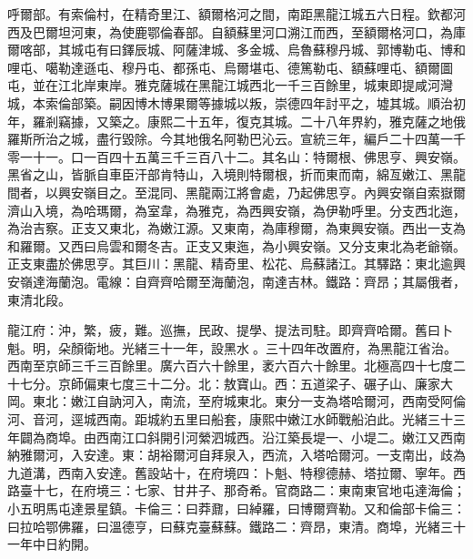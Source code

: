\begin{pinyinscope}
呼爾部。有索倫村，在精奇里江、額爾格河之間，南距黑龍江城五六日程。欽都河西及巴爾坦河東，為使鹿鄂倫春部。自額蘇里河口溯江而西，至額爾格河口，為庫爾喀部，其城屯有曰鐸辰城、阿薩津城、多金城、烏魯蘇穆丹城、郭博勒屯、博和哩屯、噶勒達遜屯、穆丹屯、都孫屯、烏爾堪屯、德篤勒屯、額蘇哩屯、額爾圖屯，並在江北岸東岸。雅克薩城在黑龍江城西北一千三百餘里，城東即提咸河灣城，本索倫部築。嗣因博木博果爾等據城以叛，崇德四年討平之，墟其城。順治初年，羅剎竊據，又築之。康熙二十五年，復克其城。二十八年界約，雅克薩之地俄羅斯所治之城，盡行毀除。今其地俄名阿勒巴沁云。宣統三年，編戶二十四萬一千零一十一。口一百四十五萬三千三百八十二。其名山：特爾根、佛思亨、興安嶺。黑省之山，皆脈自車臣汗部肯特山，入境則特爾根，折而東而南，綿亙嫩江、黑龍間者，以興安嶺目之。至混同、黑龍兩江將會處，乃起佛思亨。內興安嶺自索嶽爾濟山入境，為哈瑪爾，為室韋，為雅克，為西興安嶺，為伊勒呼里。分支西北迤，為治吉察。正支又東北，為嫩江源。又東南，為庫穆爾，為東興安嶺。西出一支為和羅爾。又西曰烏雲和爾冬吉。正支又東迤，為小興安嶺。又分支東北為老爺嶺。正支東盡於佛思亨。其巨川：黑龍、精奇里、松花、烏蘇諸江。其驛路：東北逾興安嶺達海蘭泡。電線：自齊齊哈爾至海蘭泡，南達吉林。鐵路：齊昂；其屬俄者，東清北段。

龍江府：沖，繁，疲，難。巡撫，民政、提學、提法司駐。即齊齊哈爾。舊曰卜魁。明，朵顏衛地。光緒三十一年，設黑水。三十四年改置府，為黑龍江省治。西南至京師三千三百餘里。廣六百六十餘里，袤六百六十餘里。北極高四十七度二十七分。京師偏東七度三十二分。北：敖寶山。西：五道梁子、碾子山、廉家大岡。東北：嫩江自訥河入，南流，至府城東北。東分一支為塔哈爾河，西南受阿倫河、音河，逕城西南。距城約五里曰船套，康熙中嫩江水師戰船泊此。光緒三十三年闢為商埠。由西南江口斜開引河縈泗城西。沿江築長堤一、小堤二。嫩江又西南納雅爾河，入安達。東：胡裕爾河自拜泉入，西流，入塔哈爾河。一支南出，歧為九道溝，西南入安達。舊設站十，在府境四：卜魁、特穆德赫、塔拉爾、寧年。西路臺十七，在府境三：七家、甘井子、那奇希。官商路二：東南東官地屯達海倫；小五明馬屯達景星鎮。卡倫三：曰莽鼐，曰綽羅，曰博爾齊勒。又和倫部卡倫三：曰拉哈鄂佛羅，曰溫德亨，曰蘇克臺蘇蘇。鐵路二：齊昂，東清。商埠，光緒三十一年中日約開。


\end{pinyinscope}
